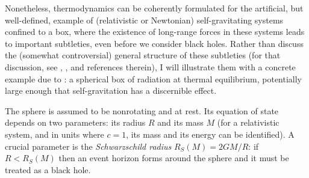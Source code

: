 \documentclass[12pt]{article}
\begin{document}
Nonetheless, thermodynamics can be coherently formulated for the artificial, but well-defined, example of (relativistic or Newtonian) self-gravitating systems confined to a box, where the existence of long-range forces in these systems leads to important subtleties, even before we consider black holes. Rather than discuss the (somewhat controversial) general structure of these subtleties (for that discussion, see , , and references therein), I will illustrate them with a concrete example due to : a spherical box of radiation at thermal equilibrium, potentially large enough that self-gravitation has a discernible effect. 

The sphere is assumed to be nonrotating and at rest. Its equation of state depends on two parameters: its radius $R$ and its mass $M$ (for a relativistic system, and in units where 
$c=1$, its mass and its energy can be identified). A crucial parameter is the \emph{Schwarzschild radius} $R_S(M)=2GM/R$: if $R<R_S(M)$ then an event horizon forms around the sphere and it must be treated as a black hole. 
\end{document}
